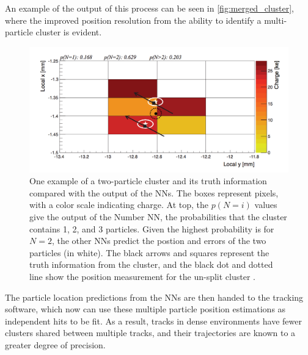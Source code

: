 
An example of the output of this process can be seen in \autoref{fig:merged_cluster}, where the improved position resolution from the ability to identify a multi-particle cluster is evident. 

\begin{centering}
\begin{figure}[bth]
\myfloatalign
\includegraphics[width=.90\linewidth]{figures/nn/merged_cluster.png}
\caption{One example of a two-particle cluster and its truth information compared with the output of the \acp{NN}. The boxes represent pixels, with a color scale indicating charge. At top, the $p(N=i)$ values give the output of the Number \ac{NN}, the probabilities that the cluster contains 1, 2, and 3 particles. Given the highest probability is for $N=2$, the other \acp{NN} predict the postion and errors of the two particles (in white). The black arrows and squares represent the truth information from the cluster, and the black dot and dotted line show the position measurement for the un-split cluster \cite{PERF-2012-05}.}
\label{fig:merged_cluster}
\end{figure}
\end{centering}

The particle location predictions from the \acp{NN} are then handed to the tracking software, which now can use these multiple particle position estimations as independent hits to be fit. As a result, tracks in dense environments have fewer clusters shared between multiple tracks, and their trajectories are known to a greater degree of precision. 


